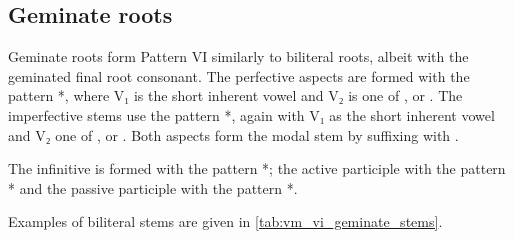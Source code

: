 \documentclass[grammar]{subfiles}
\begin{document}
 
\subsection{Geminate roots}
\label{ssec:vm_vi_geminate_roots}

Geminate roots form Pattern VI similarly to biliteral roots, albeit with the
geminated final root consonant. The perfective aspects are formed with the
pattern *, where V₁ is the short inherent vowel and V₂ is one
of ,  or .  The imperfective stems use the pattern
*, again with V₁ as the short inherent vowel and V₂ one of
,  or .  Both aspects form the modal stem by suffixing
with . 

The infinitive is formed with the pattern *; the active
participle with the pattern * and the passive participle with the
pattern *. 

Examples of biliteral stems are given in \cref{tab:vm_vi_geminate_stems}. 

\begin{table}[h!]\small\capstart
  \centering
  \\
  \caption{Pattern VI biliteral stems \label{tab:vm_vi_geminate_stems}}
\end{table}
\end{document}
